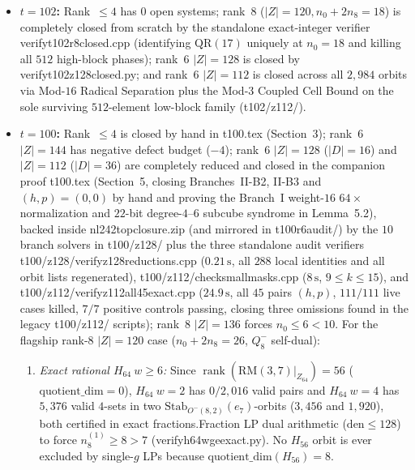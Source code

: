 \documentclass[11pt]{article}
\theoremstyle{definition}
\newcommand{\rank}{\operatorname{rank}}
\newcommand{\code}[1]{{\ttfamily\small\renewcommand{\_}{\textunderscore\allowbreak}#1}}
\begin{document}
\begin{itemize}[nosep]
    rank~$8$ at $t = 104, 106$ is unconditionally closed in Lean (\code{Balanced242T104R8.no\_rank8\_of\_t\_ge\_104}, \code{Balanced242LowBlock.no\_t106\_rank8}), rank~$6$ at $t = 106$ in \code{verify\_t106\_closed.py},
    and rank~$4,6$ at $t = 104$ in \code{verify\_t104\_closed.\{cpp,py\}}.
  \item \textbf{$t = 102$:}
    Rank~$\le 4$ has $0$ open systems; rank~$8$ ($|Z|=120, n_0+2n_8=18$) is completely closed from scratch by the standalone exact-integer verifier \code{verify\_t102\_r8\_closed.cpp} (identifying $\mathrm{QR}(17)$ uniquely at $n_0=18$ and killing all $512$ high-block phases); rank~$6$ $|Z|=128$ is closed by \code{verify\_t102\_z128\_closed.py}; and rank~$6$ $|Z|=112$ is closed across all $2{,}984$ orbits via Mod-$16$ Radical Separation plus the Mod-$3$ Coupled Cell Bound on the sole surviving $512$-element low-block family (\code{t102/z112/}).
  \item \textbf{$t = 100$:}
    Rank~$\le 4$ is closed by hand in \code{t100.tex} (Section~3); rank~$6$ $|Z|=144$ has negative defect budget ($-4$); rank~$6$ $|Z|=128$ ($|D|=16$) and $|Z|=112$ ($|D|=36$) are completely reduced and closed in the companion proof \code{t100.tex} (Section~5, closing Branches~II-B2, II-B3 and $(h,p)=(0,0)$ by hand and proving the Branch~I weight-$16$ $64\times$ normalization and $22$-bit degree-$4$--$6$ subcube syndrome in Lemma~5.2), backed inside \code{nl242\_top\_closure.zip} (and mirrored in \code{t100\_r6\_audit/}) by the $10$ branch solvers in \code{t100/z128/} plus the three standalone audit verifiers \code{t100/z128/verify\_z128\_reductions.cpp} ($0.21\,\mathrm{s}$, all $288$ local identities and all orbit lists regenerated), \code{t100/z112/check\_small\_masks.cpp} ($8\,\mathrm{s}$, $9\le k\le 15$), and \code{t100/z112/verify\_z112\_all45\_exact.cpp} ($24.9\,\mathrm{s}$, all $45$ pairs $(h,p)$, $111/111$ live cases killed, $7/7$ positive controls passing, closing three omissions found in the legacy \code{t100/z112/} scripts); rank~$8$ $|Z|=136$ forces $n_0 \le 6 < 10$.
    For the flagship rank-$8$ $|Z|=120$ case ($n_0 + 2n_8 = 26$, $Q_8^-$ self-dual):
    \begin{enumerate}[nosep]
      \item \emph{Exact rational $H_{64}\ w \ge 6$:} Since $\rank(\mathrm{RM}(3,7)|_{Z_{64}}) = 56$ ($\mathrm{quotient\_dim}=0$), $H_{64}\ w=2$ has $0/2{,}016$ valid pairs and $H_{64}\ w=4$ has $5{,}376$ valid $4$-sets in two $\mathrm{Stab}_{O^-(8,2)}(e_7)$-orbits ($3{,}456$ and $1{,}920$), both certified in exact \code{fractions.Fraction} LP dual arithmetic ($\text{den} \le 128$) to force $n_8^{(1)} \ge 8 > 7$ (\code{verify\_h64\_w\_ge\_6\_exact.py}). No $H_{56}$ orbit is ever excluded by single-$g$ LPs because $\mathrm{quotient\_dim}(H_{56}) = 8$.

\end{enumerate}
\end{itemize}
\end{document}
